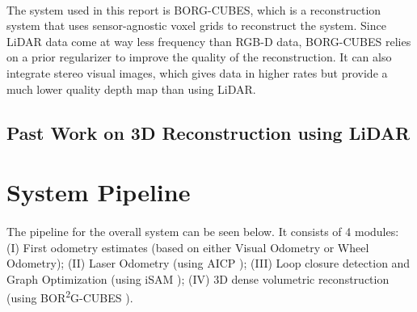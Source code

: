 \documentclass[12pt]{article}
\begin{document}
	\paragraph{}
	The system used in this report is BORG-CUBES, which is a reconstruction system that uses sensor-agnostic voxel grids to reconstruct the system. Since LiDAR data come at way less frequency than RGB-D data, BORG-CUBES relies on a prior regularizer to improve the quality of the reconstruction. It can also integrate stereo visual images, which gives data in higher rates but provide a much lower quality depth map than using LiDAR.
	
	\subsection{Past Work on 3D Reconstruction using LiDAR}
	

	\newpage
	\section{System Pipeline} \label{pipeline}
	\paragraph{}
	The pipeline for the overall system can be seen below. It consists of 4 modules: (I) First odometry estimates (based on either Visual Odometry or Wheel Odometry); (II) Laser Odometry (using AICP \cite{7989547}); (III) Loop closure detection and Graph Optimization (using iSAM \cite{Kaess08tro}); (IV) 3D dense volumetric reconstruction (using BOR\textsuperscript{2}G-CUBES \cite{TannerFSR2015}\cite{TannerArXiv2016}).
\end{document}
